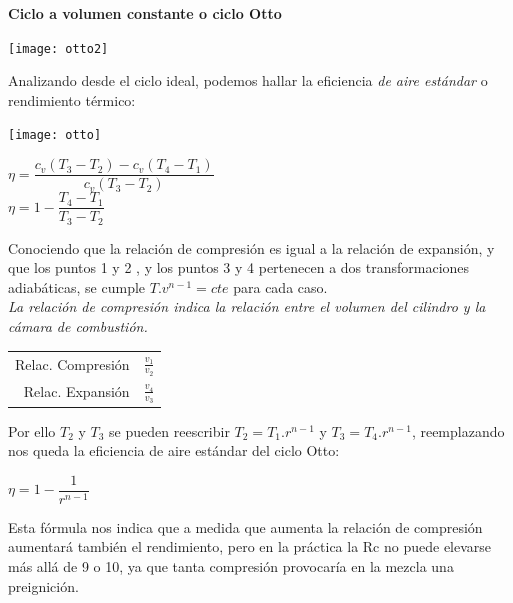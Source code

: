 \documentclass[11pt,a4paper,twocolumn]{article}
\begin{document}
	
	\textbf{Ciclo a volumen constante o ciclo Otto}\\
	
	\begin{center}
			\texttt{[image: otto2]}\\
	\end{center}

	Analizando desde el ciclo ideal, podemos hallar la eficiencia \textit{de aire estándar} o rendimiento térmico:

	\begin{center}
		\texttt{[image: otto]}
	\end{center}

	\begin{center}
		$\eta= \dfrac{c_{v}(T_{3}-T_{2})-c_{v}(T_{4}-T_{1})}{c_{v}(T_{3}-T_{2})}$\\ \vspace{0.2cm}
		$\eta=1-\dfrac{T_{4}-T_{1}}{T_{3}-T_{2}}$\\
	\end{center}

	Conociendo que la relación de compresión es igual a la relación de expansión, y que los puntos 1 y 2 , y los puntos 3 y 4 pertenecen a dos transformaciones adiabáticas, se cumple $T.v^{n-1}=cte$ para cada caso.\\
	
	\textit{La relación de compresión indica la relación entre el volumen del cilindro y la cámara de combustión.}
		\begin{tabular}{r l} 
			Relac. Compresión & $\frac{v_{1}}{v_{2}}$\\
			Relac. Expansión & $\frac{v_{4}}{v_{3}}$\\
		\end{tabular}
	
	Por ello $T_{2}$ y $T_{3}$ se pueden reescribir $T_{2}=T_{1}.r^{n-1}$ y $T_{3}=T_{4}.r^{n-1}$, reemplazando nos queda la eficiencia de aire estándar del ciclo Otto:

	\begin{center}
		$\eta=1-\dfrac{1}{r^{n-1}}$\\
	\end{center}
	Esta fórmula nos indica que a medida que aumenta la relación de compresión
	aumentará también el rendimiento, pero en la práctica la Rc no puede elevarse más
	allá de 9 o 10, ya que tanta compresión provocaría en la mezcla una preignición.\\	
	
\end{document}
